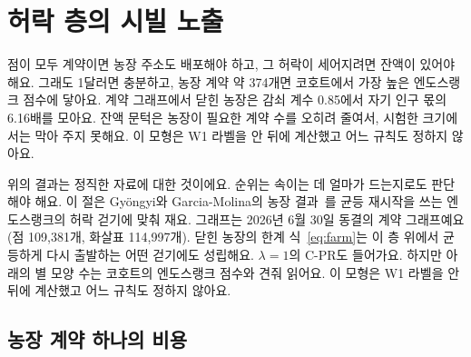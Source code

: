\section{허락 층의 시빌 노출}
\label{sec:sybil}

\begin{yoji}
점이 모두 계약이면 농장 주소도 배포해야 하고, 그 허락이 세어지려면 잔액이 있어야 해요. 그래도 1달러면 충분하고, 농장 계약 약 374개면 코호트에서 가장 높은 엔도스랭크 점수에 닿아요. 계약 그래프에서 닫힌 농장은 감쇠 계수 0.85에서 자기 인구 몫의 6.16배를 모아요. 잔액 문턱은 농장이 필요한 계약 수를 오히려 줄여서, 시험한 크기에서는 막아 주지 못해요. 이 모형은 W1 라벨을 안 뒤에 계산했고 어느 규칙도 정하지 않아요.
\end{yoji}

위의 결과는 정직한 자료에 대한 것이에요. 순위는 속이는 데 얼마가 드는지로도 판단해야 해요. 이 절은 Gy\"{o}ngyi와 Garcia-Molina의 농장 결과~\cite{gyongyi2005alliances}를 균등 재시작을 쓰는 엔도스랭크의 허락 걷기에 맞춰 재요. 그래프는 2026년 6월 30일 동결의 계약 그래프예요(점 109,381개, 화살표 114,997개). 닫힌 농장의 한계 식~\eqref{eq:farm}는 이 층 위에서 균등하게 다시 출발하는 어떤 걷기에도 성립해요. $\lambda=1$의 C-PR도 들어가요. 하지만 아래의 별 모양 수는 코호트의 엔도스랭크 점수와 견줘 읽어요. 이 모형은 W1 라벨을 안 뒤에 계산했고 어느 규칙도 정하지 않아요.

\subsection{농장 계약 하나의 비용}

